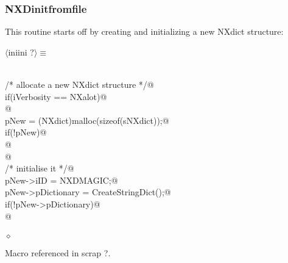 \documentclass[12pt]{article}
\begin{document}
\subsubsection{NXDinitfromfile}
This routine starts off by creating and initializing a new NXdict structure:
\begin{flushleft} \small
\begin{minipage}{\linewidth} \label{scrap6}
$\langle$iniini {\footnotesize ?}$\rangle\equiv$
\vspace{-1ex}
\begin{list}{}{} \item
\mbox{}\verb@@\\
\mbox{}\verb@     /* allocate a new NXdict structure */@\\
\mbox{}\verb@     if(iVerbosity == NXalot)@\\
\mbox{}@\\
\mbox{}\verb@     pNew = (NXdict)malloc(sizeof(sNXdict));@\\
\mbox{}\verb@     if(!pNew)@\\
\mbox{}@\\
\mbox{}\verb@     @\\
\mbox{}\verb@     /* initialise it */@\\
\mbox{}\verb@     pNew->iID = NXDMAGIC;@\\
\mbox{}\verb@     pNew->pDictionary = CreateStringDict();@\\
\mbox{}\verb@     if(!pNew->pDictionary)@\\
\mbox{}@\\
\mbox{}\verb@@\\
\mbox{}\verb@@$\diamond$
\end{list}
\vspace{-1ex}
\footnotesize\addtolength{\baselineskip}{-1ex}
\begin{list}{}{\setlength{\itemsep}{-\parsep}\setlength{\itemindent}{-\leftmargin}}
\item Macro referenced in scrap ?.
\end{list}
\end{minipage}\\[4ex]
\end{flushleft}
\end{document}
